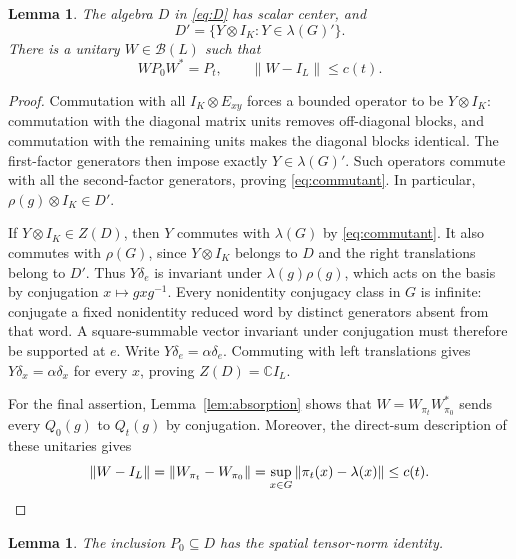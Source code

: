 \documentclass[11pt]{article}
\newtheorem{lemma}[theorem]{Lemma}
\theoremstyle{definition}
\theoremstyle{remark}
\newcommand{\C}{\mathbb C}
\newcommand{\B}{\mathcal B}
\newcommand{\id}{I}
\newcommand{\norm}[1]{\left\|#1\right\|}
\begin{document}
\begin{lemma}\label{lem:ambient}
The algebra $D$ in \eqref{eq:D} has scalar center, and
\begin{equation}\label{eq:commutant}
D'=\{Y\otimes\id_K:Y\in\lambda(G)'\}.
\end{equation}
There is a unitary $W\in\B(L)$ such that
\begin{equation}\label{eq:close-W}
WP_0W^*=P_t,\qquad \norm{W-\id_L}\le c(t).
\end{equation}
\end{lemma}

\begin{proof}
Commutation with all $\id_K\otimes E_{xy}$ forces a bounded operator to
be $Y\otimes\id_K$: commutation with the diagonal matrix units removes
off-diagonal blocks, and commutation with the remaining units makes the
diagonal blocks identical. The first-factor generators then impose
exactly $Y\in\lambda(G)'$. Such operators commute with all the
second-factor generators, proving \eqref{eq:commutant}. In particular,
$\rho(g)\otimes\id_K\in D'$.

If $Y\otimes\id_K\in Z(D)$, then $Y$ commutes with $\lambda(G)$ by
\eqref{eq:commutant}. It also commutes with $\rho(G)$, since
$Y\otimes\id_K$ belongs to $D$ and the right translations belong to
$D'$. Thus $Y\delta_e$ is invariant under $\lambda(g)\rho(g)$, which
acts on the basis by conjugation $x\mapsto gxg^{-1}$.
Every nonidentity conjugacy class in $G$ is infinite: conjugate a fixed
nonidentity reduced word by distinct generators absent from that word.
A square-summable vector invariant under conjugation must therefore be
supported at $e$. Write $Y\delta_e=\alpha\delta_e$. Commuting with left
translations gives $Y\delta_x=\alpha\delta_x$ for every $x$, proving
$Z(D)=\C\id_L$.

For the final assertion, Lemma~\ref{lem:absorption} shows that
$W=W_{\pi_t}W_{\pi_0}^*$ sends every $Q_0(g)$ to $Q_t(g)$ by conjugation.
Moreover, the direct-sum description of these unitaries gives
\[
\norm{W-\id_L}=\norm{W_{\pi_t}-W_{\pi_0}}
=\sup_{x\in G}\norm{\pi_t(x)-\lambda(x)}\le c(t).
\qedhere
\]
\end{proof}

\begin{lemma}\label{lem:good-inclusion}
The inclusion $P_0\subseteq D$ has the spatial tensor-norm identity.
\end{lemma}
\end{document}
